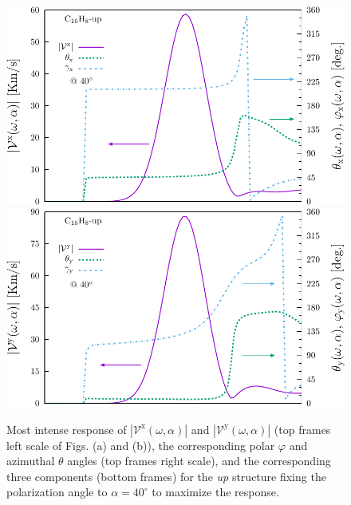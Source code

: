 \documentclass[prb,11pt,tightenlines,twocolumn,aps]{revtex4-1}
\begin{document}
\begin{figure}[t]
    \centering
    \includegraphics[width=\linewidth]{upplots/up-vxb-rtp-m1}
    \label{fig:up-vx-comp-rtp-1}
    \\
    \includegraphics[width=\linewidth]{upplots/up-vyb-rtp-m1}
    \label{fig:up-vy-comp-rtp-1}
    
    \caption{Most intense response of
    $|\mathcal{V}^{\mathrm{x}}(\omega,\alpha)|$ and
    $|\mathcal{V}^{\mathrm{y}}(\omega,\alpha)|$ (top frames left scale of Figs.
    (a) and (b)), the corresponding polar $\varphi$ and azimuthal $\theta$
    angles (top frames right scale), and the corresponding three components
    (bottom frames) for the \emph{up} structure fixing the polarization angle to
    $\alpha=40^{\circ}$ to maximize the response.}
    \label{fig:up-vab-comp-rtp-1}
\end{figure}
\end{document}
